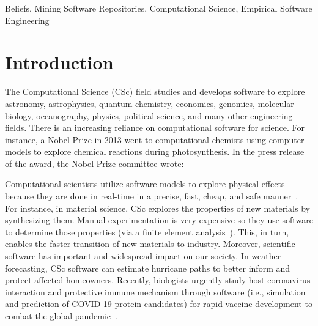 \documentclass[conference,10pt]{IEEEtran}
\begin{document}
\begin{IEEEkeywords}
Beliefs, Mining Software Repositories, Computational Science, Empirical Software Engineering
\end{IEEEkeywords}



%
%
\vspace{-8pt}
\section{Introduction}
  

The Computational Science (CSc)
field studies and develops software to explore
 astronomy, astrophysics, quantum chemistry, economics, genomics, molecular biology, oceanography, physics, political science,  and many other  engineering fields. 
There is an increasing reliance on computational software for science. For instance, a Nobel Prize in 2013 went to computational chemists using computer models to explore chemical reactions during photosynthesis. In the press release of the award, the Nobel Prize committee wrote: \vspace{-2pt}

\begin{quote}
\end{quote}


Computational scientists utilize software models to explore physical effects because they are done in real-time in a precise, fast, cheap, and safe manner~\cite{heaton15_lit}. For instance, in material science, CSc explores the properties
of new materials by synthesizing them. Manual experimentation is very expensive so they %
use software to determine
those properties (via a finite element analysis~\cite{fea_01}). This, in turn, enables the faster transition of new materials to industry. Moreover, scientific software has important and widespread impact on our society. In weather forecasting, CSc
software can estimate hurricane paths to better inform and protect affected homeowners. Recently, biologists urgently study host-coronavirus interaction and protective immune mechanism through software (i.e., simulation and prediction of COVID-19 protein candidates) for rapid vaccine development to combat the global pandemic~\cite{covid}. 

\end{document}
